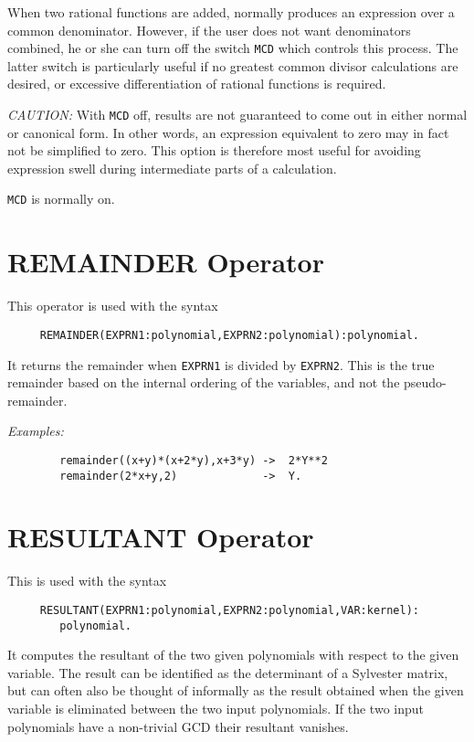When two rational functions are added, {\REDUCE} normally produces an
expression over a common denominator. However, if the user does not want
denominators combined, he or she can turn off the switch {\tt MCD}
 which controls this process.  The latter switch is
particularly useful if no greatest common divisor calculations are
desired, or excessive differentiation of rational functions is required.

{\it CAUTION:}  With {\tt MCD} off, results are not guaranteed to come out in
either normal or canonical form.  In other words, an expression equivalent
to zero may in fact not be simplified to zero.  This option is therefore
most useful for avoiding expression swell during intermediate parts of a
calculation.

{\tt MCD} is normally on.

\section{REMAINDER Operator}

This operator is used with the syntax
\begin{verbatim}
     REMAINDER(EXPRN1:polynomial,EXPRN2:polynomial):polynomial.
\end{verbatim}
It returns the remainder when {\tt EXPRN1} is divided by {\tt EXPRN2}.  This
is the true remainder based on the internal ordering of the variables, and
not the pseudo-remainder.

{\it Examples:}
\begin{verbatim}
        remainder((x+y)*(x+2*y),x+3*y) ->  2*Y**2
        remainder(2*x+y,2)             ->  Y.
\end{verbatim}

\section{RESULTANT Operator}

This is used with the syntax
\begin{verbatim}
     RESULTANT(EXPRN1:polynomial,EXPRN2:polynomial,VAR:kernel):
        polynomial.
\end{verbatim}
It computes the resultant of the two given polynomials with respect to the
given variable. The result can be identified as the determinant of a
Sylvester matrix, but can often also be thought of informally as the
result obtained when the given variable is eliminated between the two input
polynomials. If the two input polynomials have a non-trivial GCD their
resultant vanishes.

